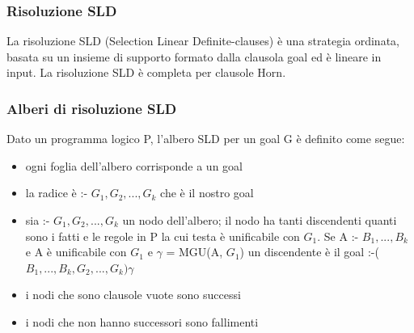 \documentclass{article}
\begin{document}
\subsubsection{Risoluzione SLD}
La risoluzione SLD (Selection Linear Definite-clauses) è una strategia ordinata, basata su un insieme di supporto formato dalla clausola goal ed è lineare in input. La risoluzione SLD è completa per clausole Horn.

\subsubsection{Alberi di risoluzione SLD}
Dato un programma logico P, l’albero SLD per un goal G è definito come segue:
\begin{itemize}
    \item ogni foglia dell'albero corrisponde a un goal
    \item la radice è :- $G_1, G_2, ..., G_k$ che è il nostro goal
    \item sia :- $G_1, G_2, ..., G_k$ un nodo dell'albero; il nodo ha tanti discendenti quanti sono i fatti e le regole in P la cui testa è unificabile con $G_1$. \newline 
    Se A :- $B_1, ..., B_k$ e A è unificabile con $G_1$ e $\gamma$ = MGU(A, $G_1$) \newline 
    un discendente è il goal :-($B_1, ..., B_k, G_2, ..., G_k) \gamma$
    \item i nodi che sono clausole vuote sono successi
    \item i nodi che non hanno successori sono fallimenti
\end{itemize}
\end{document}
